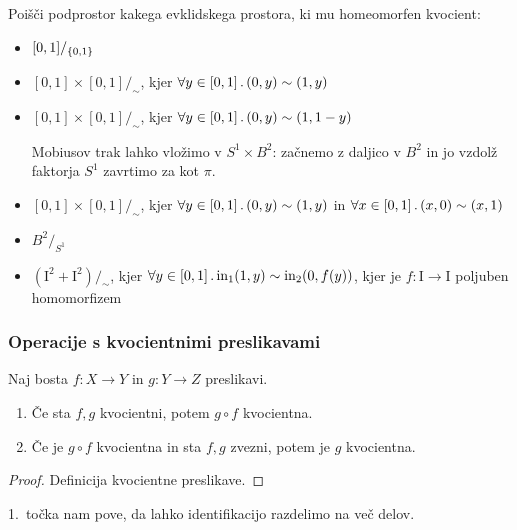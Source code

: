 \begin{primer}
    Poišči podprostor kakega evklidskega prostora, ki mu homeomorfen kvocient:
    \begin{itemize}
        \item \([0,1]/_{\left\{0, 1\right\}}\)
        \item \([0,1] \times [0,1]/_\sim\), kjer \(\forall y \in [0,1] \,.\, (0, y) \sim (1, y)\)
        \item \([0,1] \times [0,1]/_\sim\), kjer \(\forall y \in [0,1] \,.\, (0, y) \sim (1, 1- y)\)
        \begin{opomba}
            Mobiusov trak lahko vložimo v \(S^1 \times B^2\): začnemo z daljico v \(B^2\) in jo vzdolž faktorja \(S^1\) zavrtimo za kot \(\pi\).
        \end{opomba}
        \item \([0,1] \times [0,1]/_\sim\), kjer \(\forall y \in [0,1] \,.\, (0, y) \sim (1, y)\) in \(\forall x \in [0,1] \,.\, (x, 0) \sim (x, 1)\)
        \item \(B^2/_{S^1}\)
        \item \((\text{I}^2 + \text{I}^2)/_\sim\), kjer \(\forall y \in [0,1] \,.\, \text{in}_1 (1, y) \sim \text{in}_2 (0, f(y))\), kjer je \(f: \text{I} \to \text{I}\) poljuben homomorfizem
    \end{itemize}
\end{primer}

\subsubsection*{Operacije s kvocientnimi preslikavami}
\begin{trditev}
    Naj bosta \(f: X \to Y\) in \(g: Y \to Z\) preslikavi.
    \begin{enumerate}
        \item Če sta \(f, g\) kvocientni, potem \(g \circ f\) kvocientna.
        \item Če je \(g \circ f\) kvocientna in sta \(f, g\) zvezni, potem je \(g\) kvocientna.
    \end{enumerate}
\end{trditev}

\begin{proof}
    Definicija kvocientne preslikave.
\end{proof}

\begin{opomba}
    1.\ točka nam pove, da lahko identifikacijo razdelimo na več delov.
\end{opomba}

